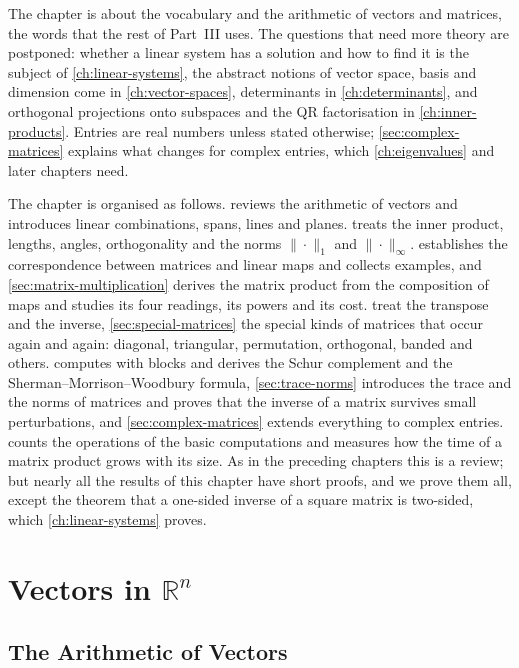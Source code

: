 The chapter is about the vocabulary and the arithmetic of vectors and matrices, the words that the rest of Part~III uses. The questions that need more theory are postponed: whether a linear system has a solution and how to find it is the subject of \cref{ch:linear-systems}, the abstract notions of vector space, basis and dimension come in \cref{ch:vector-spaces}, determinants in \cref{ch:determinants}, and orthogonal projections onto subspaces and the QR factorisation in \cref{ch:inner-products}. Entries are real numbers unless stated otherwise; \cref{sec:complex-matrices} explains what changes for complex entries, which \cref{ch:eigenvalues} and later chapters need.

The chapter is organised as follows.  reviews the arithmetic of vectors and introduces linear combinations, spans, lines and planes.  treats the inner product, lengths, angles, orthogonality and the norms $\|\cdot\|_1$ and $\|\cdot\|_\infty$.  establishes the correspondence between matrices and linear maps and collects examples, and \cref{sec:matrix-multiplication} derives the matrix product from the composition of maps and studies its four readings, its powers and its cost.  treat the transpose and the inverse, \cref{sec:special-matrices} the special kinds of matrices that occur again and again: diagonal, triangular, permutation, orthogonal, banded and others.  computes with blocks and derives the Schur complement and the Sherman--Morrison--Woodbury formula, \cref{sec:trace-norms} introduces the trace and the norms of matrices and proves that the inverse of a matrix survives small perturbations, and \cref{sec:complex-matrices} extends everything to complex entries.  counts the operations of the basic computations and measures how the time of a matrix product grows with its size. As in the preceding chapters this is a review; but nearly all the results of this chapter have short proofs, and we prove them all, except the theorem that a one-sided inverse of a square matrix is two-sided, which \cref{ch:linear-systems} proves.

\section{Vectors in \texorpdfstring{$\mathbb R^n$}{R\^{}n}}
\label{sec:vectors-in-rn}

\subsection{The Arithmetic of Vectors}

